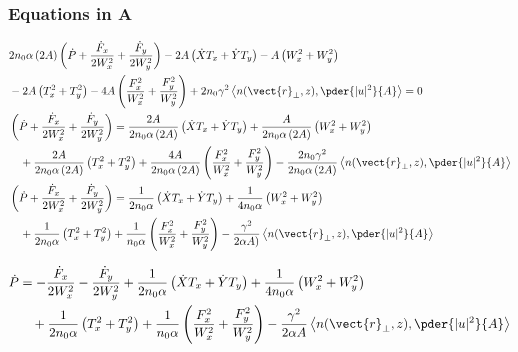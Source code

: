 \subsubsection{ Equations in A}
\begin{equation}
\begin{split}
    &2 n_0 \alpha\, (2A) \left(\dot{P}  + \frac{\dot{F}_{x} }{2W_{x}^2} + \frac{\dot{F}_{y}}{2W_{y}^2} \right) - 2A  \left(\dot{X}T_x + \dot{Y} T_y\right)  - A  \left(W_x^2+ W_y^2\right) \\
    &- 2A  \left(T_x^2 + T_y^2 \right) - 4A  \left(\frac{F_{x}^2}{W_{x}^2} + \frac{F_{y}^2}{W_{y}^2}\right) +  2n_0 \gamma^2 \left< n(\vect{r}_{\perp},z),\pder{|u|^2}{A}\right> = 0\\
    & \left(\dot{P}  + \frac{\dot{F}_{x} }{2W_{x}^2} + \frac{\dot{F}_{y}}{2W_{y}^2} \right) = \frac{2A}{2 n_0 \alpha\, (2A)}  \left(\dot{X}T_x + \dot{Y} T_y\right)  + \frac{A}{2 n_0 \alpha\, (2A)}  \left(W_x^2+ W_y^2\right) \\
    &\quad+ \frac{2A}{2 n_0 \alpha\, (2A)}  \left(T_x^2 + T_y^2 \right) + \frac{4A}{2 n_0 \alpha\, (2A)}  \left(\frac{F_{x}^2}{W_{x}^2} + \frac{F_{y}^2}{W_{y}^2}\right) -  \frac{2n_0 \gamma^2}{2 n_0 \alpha\, (2A)} \left< n(\vect{r}_{\perp},z),\pder{|u|^2}{A}\right> \\ 
    & \left(\dot{P}  + \frac{\dot{F}_{x} }{2W_{x}^2} + \frac{\dot{F}_{y}}{2W_{y}^2} \right) = \frac{1}{2 n_0 \alpha}  \left(\dot{X}T_x + \dot{Y} T_y\right)  + \frac{1}{4 n_0 \alpha}  \left(W_x^2+ W_y^2\right) \\
    &\quad + \frac{1}{2 n_0 \alpha}  \left(T_x^2 + T_y^2 \right) + \frac{1}{n_0 \alpha}  \left(\frac{F_{x}^2}{W_{x}^2} + \frac{F_{y}^2}{W_{y}^2}\right) -  \frac{\gamma^2}{2 \alpha A)} \left< n(\vect{r}_{\perp},z),\pder{|u|^2}{A}\right>    
\end{split}
\end{equation}

\begin{equation}
\begin{split}
    \dot{P}  &= -\frac{\dot{F}_{x} }{2W_{x}^2} - \frac{\dot{F}_{y}}{2W_{y}^2} 
    + \frac{1}{2 n_0 \alpha}  \left(\dot{X}T_x + \dot{Y} T_y\right) 
     + \frac{1}{4 n_0 \alpha}  \left(W_x^2+ W_y^2\right) \\    
    &\quad + \frac{1}{2 n_0 \alpha}  \left(T_x^2 + T_y^2 \right) + \frac{1}{n_0 \alpha}  \left(\frac{F_{x}^2}{W_{x}^2} + \frac{F_{y}^2}{W_{y}^2}\right) -  \frac{\gamma^2}{2 \alpha A} \left< n(\vect{r}_{\perp},z),\pder{|u|^2}{A}\right>    
\end{split}
\end{equation}




